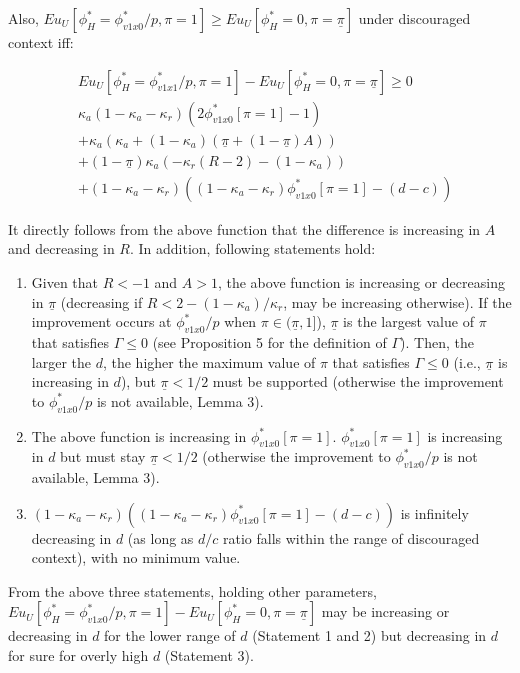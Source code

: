 \par Also, $Eu_U[\phi^*_H = \phi^*_{v1x0}/p, \pi=1] \geq Eu_U[\phi^*_H=0,\pi=\underline{\pi}]$ under discouraged context iff: 

\begin{align*}
	&Eu_U[\phi^*_H = \phi^*_{v1x1}/p, \pi=1] - Eu_U[\phi^*_H=0,\pi=\underline{\pi}] \geq 0 \\
	&\kappa_a(1-\kappa_a-\kappa_r)(2\phi^*_{v1x0}[\pi=1]-1)\\
	&+\kappa_a(\kappa_a + (1-\kappa_a)(\underline{\pi} + (1-\underline{\pi})A)) \\
	&+(1-\underline{\pi}) \kappa_a (-\kappa_r(R-2)-(1-\kappa_a))\\
	&+(1-\kappa_a-\kappa_r)((1-\kappa_a-\kappa_r)\phi^*_{v1x0}[\pi=1]-(d-c))
\end{align*}

\par It directly follows from the above function that the difference is increasing in $A$ and decreasing in $R$. In addition, following statements hold:

\begin{enumerate}
	\item Given that $R<-1$ and $A>1$, the above function is increasing or decreasing in $\underline{\pi}$ (decreasing if $R < 2 - (1-\kappa_a)/\kappa_r$, may be increasing otherwise). If the improvement occurs at $\phi^*_{v1x0}/p$ when $\pi \in (\underline{\pi},1]$), $\underline{\pi}$ is the largest value of $\pi$ that satisfies $\Gamma\leq0$ (see Proposition 5 for the definition of $\Gamma$). Then, the larger the $d$, the higher the maximum value of $\pi$ that satisfies $\Gamma\leq0$ (i.e., $\underline{\pi}$ is increasing in $d$), but $\underline{\pi}<1/2$ must be supported (otherwise the improvement to $\phi^*_{v1x0}/p$ is not available, Lemma 3). 
	\item The above function is increasing in $\phi^*_{v1x0}[\pi=1]$. $\phi^*_{v1x0}[\pi=1]$ is increasing in $d$ but must stay $\underline{\pi}<1/2$ (otherwise the improvement to $\phi^*_{v1x0}/p$ is not available, Lemma 3). 
	\item $(1-\kappa_a-\kappa_r)((1-\kappa_a-\kappa_r)\phi^*_{v1x0}[\pi=1]-(d-c))$ is infinitely decreasing in $d$ (as long as $d/c$ ratio falls within the range of discouraged context), with no minimum value.
\end{enumerate}

\noindent From the above three statements, holding other parameters, $Eu_U[\phi^*_H = \phi^*_{v1x0}/p, \pi=1] - Eu_U[\phi^*_H=0,\pi=\underline{\pi}]$ may be increasing or decreasing in $d$ for the lower range of $d$ (Statement 1 and 2) but decreasing in $d$ for sure for overly high $d$ (Statement 3).

